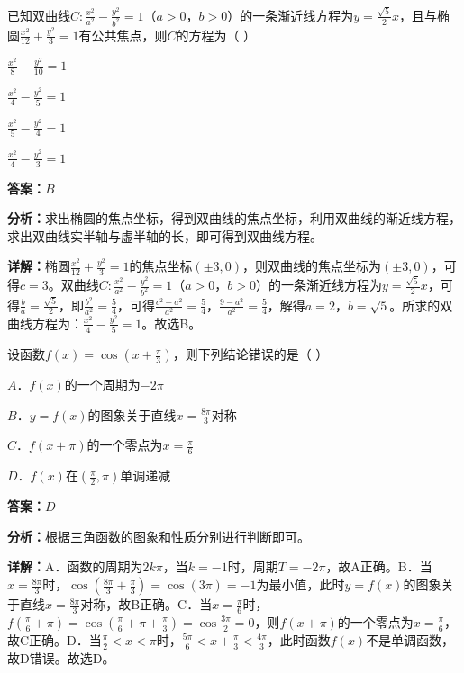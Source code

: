 \begin{question}[points=5]
已知双曲线$C:\frac{x^2}{a^2}-\frac{y^2}{b^2}=1$（$a>0$，$b>0$）的一条渐近线方程为$y=\frac{\sqrt{5}}{2}x$，且与椭圆$\frac{x^2}{12}+\frac{y^2}{3}=1$有公共焦点，则$C$的方程为（ ）
\begin{choices}
  \item $\frac{x^2}{8}-\frac{y^2}{10}=1$
  \item $\frac{x^2}{4}-\frac{y^2}{5}=1$
  \item $\frac{x^2}{5}-\frac{y^2}{4}=1$
  \item $\frac{x^2}{4}-\frac{y^2}{3}=1$
\end{choices}
\begin{solution}
\textbf{答案：}$B$

\textbf{分析：}求出椭圆的焦点坐标，得到双曲线的焦点坐标，利用双曲线的渐近线方程，求出双曲线实半轴与虚半轴的长，即可得到双曲线方程。

\textbf{详解：}椭圆$\frac{x^2}{12}+\frac{y^2}{3}=1$的焦点坐标$(\pm 3,0)$，则双曲线的焦点坐标为$(\pm 3,0)$，可得$c=3$。双曲线$C:\frac{x^2}{a^2}-\frac{y^2}{b^2}=1$（$a>0$，$b>0$）的一条渐近线方程为$y=\frac{\sqrt{5}}{2}x$，可得$\frac{b}{a}=\frac{\sqrt{5}}{2}$，即$\frac{b^2}{a^2}=\frac{5}{4}$，可得$\frac{c^2-a^2}{a^2}=\frac{5}{4}$，$\frac{9-a^2}{a^2}=\frac{5}{4}$，解得$a=2$，$b=\sqrt{5}$。所求的双曲线方程为：$\frac{x^2}{4}-\frac{y^2}{5}=1$。故选B。
\end{solution}
\end{question}

\begin{question}[points=5]
设函数$f(x)=\cos(x+\frac{\pi}{3})$，则下列结论错误的是（ ）
\begin{choices}
  \item $A$．$f(x)$的一个周期为$-2\pi$
  \item $B$．$y=f(x)$的图象关于直线$x=\frac{8\pi}{3}$对称
  \item $C$．$f(x+\pi)$的一个零点为$x=\frac{\pi}{6}$
  \item $D$．$f(x)$在$(\frac{\pi}{2},\pi)$单调递减
\end{choices}
\begin{solution}
\textbf{答案：}$D$

\textbf{分析：}根据三角函数的图象和性质分别进行判断即可。

\textbf{详解：}A．函数的周期为$2k\pi$，当$k=-1$时，周期$T=-2\pi$，故A正确。B．当$x=\frac{8\pi}{3}$时，$\cos(\frac{8\pi}{3}+\frac{\pi}{3})=\cos(3\pi)=-1$为最小值，此时$y=f(x)$的图象关于直线$x=\frac{8\pi}{3}$对称，故B正确。C．当$x=\frac{\pi}{6}$时，$f(\frac{\pi}{6}+\pi)=\cos(\frac{\pi}{6}+\pi+\frac{\pi}{3})=\cos\frac{3\pi}{2}=0$，则$f(x+\pi)$的一个零点为$x=\frac{\pi}{6}$，故C正确。D．当$\frac{\pi}{2}<x<\pi$时，$\frac{5\pi}{6}<x+\frac{\pi}{3}<\frac{4\pi}{3}$，此时函数$f(x)$不是单调函数，故D错误。故选D。
\end{solution}
\end{question}

